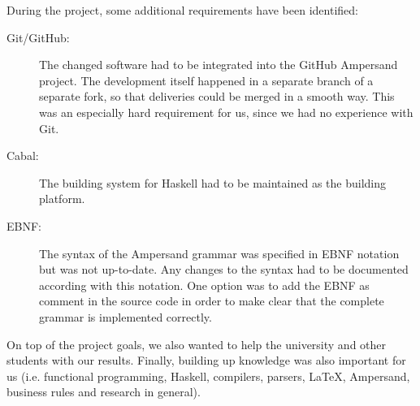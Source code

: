 During the project, some additional requirements have been identified:
\begin{description}
  \item [Git/GitHub:] The changed software had to be integrated into the GitHub Ampersand project.
    The development itself happened in a separate branch of a separate fork, so that deliveries could be merged in a smooth way.
    This was an especially hard requirement for us, since we had no experience with Git.
  \item [Cabal:] The building system for Haskell had to be maintained as the building platform.
  \item [EBNF:] The syntax of the Ampersand grammar was specified in EBNF notation but was not up-to-date.
    Any changes to the syntax had to be documented according with this notation.
    One option was to add the EBNF as comment in the source code in order to make clear that the complete grammar is implemented correctly.
\end{description}

On top of the project goals, we also wanted to help the university and other students with our results.
Finally, building up knowledge was also important for us (i.e. functional programming, Haskell, compilers, parsers, LaTeX, Ampersand, business rules and research in general).
